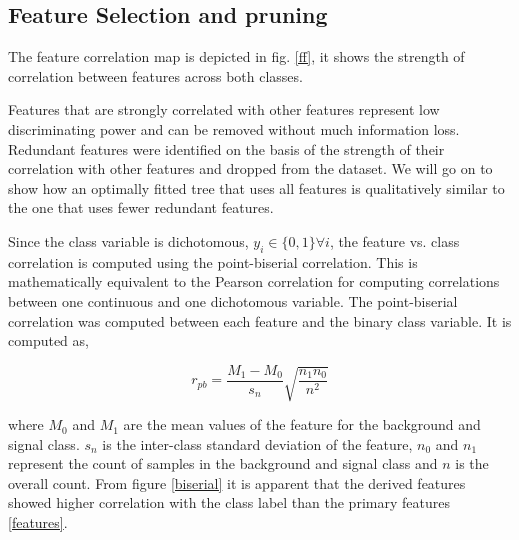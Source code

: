 \documentclass[final,3p,times,twocolumn]{elsarticle}
\begin{document}
\subsection{Feature Selection and pruning}
The feature correlation map is depicted in fig. \ref{ff}, it shows the strength of correlation between features across both classes. 

Features that are strongly correlated with other features represent low discriminating power and can be removed without much information loss. Redundant features were identified on the basis of the strength of their correlation with other features and dropped from the dataset. We will go on to show how an optimally fitted tree that uses all features is qualitatively similar to the one that uses fewer redundant features. 

Since the class variable is dichotomous, $y_{i} \in \{0,1\} \forall i$, the feature vs. class correlation is computed using the point-biserial correlation. This is mathematically equivalent to the Pearson correlation for computing correlations between one continuous and one dichotomous variable. The point-biserial correlation was computed between each feature and the binary class variable. It is computed as, 

\begin{equation}
r_{pb} = \dfrac{M_{1} - M_{0}}{s_{n}}\sqrt{\dfrac{n_{1}n_{0}}{n^2}}
\end{equation}

where $M_{0}$ and $M_{1}$ are the mean values of the feature for the background and signal class. $s_{n}$ is the inter-class standard deviation of the feature, $n_{0}$ and $n_{1}$ represent the count of samples in the background and signal class and $n$ is the overall count. From figure \ref{biserial} it is apparent that the derived features showed higher correlation with the class label than the primary features \ref{features}. 
 
\end{document}
